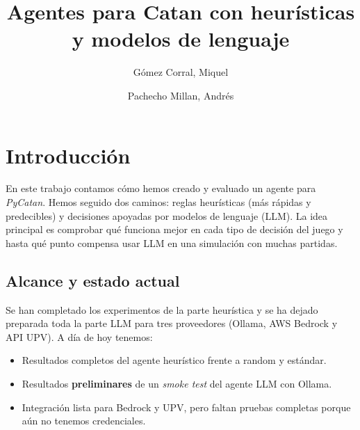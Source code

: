\documentclass[11pt,spanish,listoffigures,listoftables]{tfgetsinf}
\title{Agentes para Catan con heurísticas y modelos de lenguaje}
\author{Gómez Corral, Miquel \and Pachecho Millan, Andrés}
\begin{document}
 









\mainmatter

\chapter{Introducción}
En este trabajo contamos cómo hemos creado y evaluado un agente para \textit{PyCatan}. Hemos seguido dos caminos: reglas heurísticas (más rápidas y predecibles) y decisiones apoyadas por modelos de lenguaje (LLM). La idea principal es comprobar qué funciona mejor en cada tipo de decisión del juego y hasta qué punto compensa usar LLM en una simulación con muchas partidas.

\section{Alcance y estado actual}
Se han completado los experimentos de la parte heurística y se ha dejado preparada toda la parte LLM para tres proveedores (Ollama, AWS Bedrock y API UPV). A día de hoy tenemos:
\begin{itemize}
  \item Resultados completos del agente heurístico frente a random y estándar.
  \item Resultados \textbf{preliminares} de un \textit{smoke test} del agente LLM con Ollama.
  \item Integración lista para Bedrock y UPV, pero faltan pruebas completas porque aún no tenemos credenciales.
\end{itemize}
\end{document}
